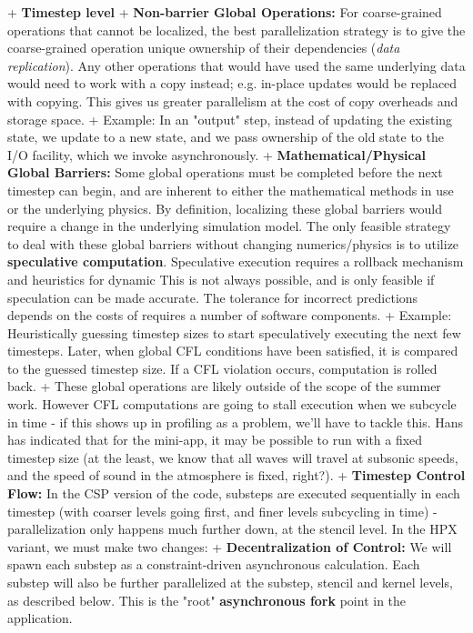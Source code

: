 \documentclass[final,letterpaper,10pt]{article}
\begin{document}
+ \textbf{Timestep level}
    + \textbf{Non-barrier Global Operations:} For coarse-grained operations that cannot be localized, the best parallelization strategy is to give the coarse-grained operation unique ownership of their dependencies (\emph{data replication}). Any other operations that would have used the same underlying data would need to work with a copy instead; e.g. in-place updates would be replaced with copying. This gives us greater parallelism at the cost of copy overheads and storage space.
        + Example: In an "output" step, instead of updating the existing state, we update to a new state, and we pass ownership of the old state to the I/O facility, which we invoke asynchronously. 
    + \textbf{Mathematical/Physical Global Barriers:} Some global operations must be completed before the next timestep can begin, and are inherent to either the mathematical methods in use or the underlying physics. By definition, localizing these global barriers would require a change in the underlying simulation model. The only feasible strategy to deal with these global barriers without changing numerics/physics is to utilize \textbf{speculative computation}. Speculative execution requires a rollback mechanism and heuristics for dynamic This is not always possible, and is only feasible if speculation can be made accurate. The tolerance for incorrect predictions depends on the costs of requires a number of software components.
        + Example: Heuristically guessing timestep sizes to start speculatively executing the next few timesteps. Later, when global CFL conditions have been satisfied, it is compared to the guessed timestep size. If a CFL violation occurs, computation is rolled back.
    + These global operations are likely outside of the scope of the summer work. However CFL computations are going to stall execution when we subcycle in time - if this shows up in profiling as a problem, we'll have to tackle this. Hans has indicated that for the mini-app, it may be possible to run with a fixed timestep size (at the least, we know that all waves will travel at subsonic speeds, and the speed of sound in the atmosphere is fixed, right?).
    + \textbf{Timestep Control Flow:} In the CSP version of the code, substeps are executed sequentially in each timestep (with coarser levels going first, and finer levels subcycling in time) - parallelization only happens much further down, at the stencil level. In the HPX variant, we must make two changes:
        + \textbf{Decentralization of Control:} We will spawn each substep as a constraint-driven asynchronous calculation. Each substep will also be further parallelized at the substep, stencil and kernel levels, as described below. This is the "root" \textbf{asynchronous fork} point in the application.
\end{document}
